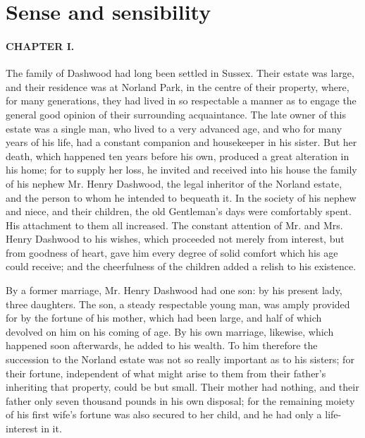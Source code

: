 \part{Sense and sensibility}
\subsection[chapter-i.]{\useURL[url1][][][]\from[url1]CHAPTER I.}

The family of Dashwood had long been settled in Sussex. Their estate was large, and their residence was at Norland Park, in the centre of their property, where, for many generations, they had lived in so respectable a manner as to engage the general good opinion of their surrounding acquaintance. The late owner of this estate was a single man, who lived to a very advanced age, and who for many years of his life, had a constant companion and housekeeper in his sister. But her death, which happened ten years before his own, produced a great alteration in his home; for to supply her loss, he invited and received into his house the family of his nephew Mr. Henry Dashwood, the legal inheritor of the Norland estate, and the person to whom he intended to bequeath it. In the society of his nephew and niece, and their children, the old Gentleman's days were comfortably spent. His attachment to them all increased. The constant attention of Mr. and Mrs. Henry Dashwood to his wishes, which proceeded not merely from interest, but from goodness of heart, gave him every degree of solid comfort which his age could receive; and the cheerfulness of the children added a relish to his existence.

By a former marriage, Mr. Henry Dashwood had one son: by his present lady, three daughters. The son, a steady respectable young man, was amply provided for by the fortune of his mother, which had been large, and half of which devolved on him on his coming of age. By his own marriage, likewise, which happened soon afterwards, he added to his wealth. To him therefore the succession to the Norland estate was not so really important as to his sisters; for their fortune, independent of what might arise to them from their father's inheriting that property, could be but small. Their mother had nothing, and their father only seven thousand pounds in his own disposal; for the remaining moiety of his first wife's fortune was also secured to her child, and he had only a life-interest in it.

